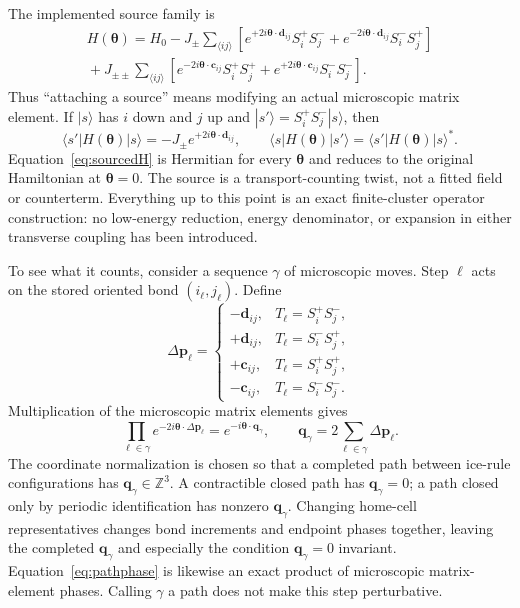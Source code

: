 \documentclass[11pt]{article}
\newcommand{\Jpm}{J_{\pm}}
\newcommand{\Jpp}{J_{\pm\pm}}
\newcommand{\bq}{\bm q}
\newcommand{\btheta}{\bm\theta}
\begin{document}
The implemented source family is
\begin{align}
 H(\btheta)=H_0-\Jpm\sum_{\langle ij\rangle}
 \left[e^{+2i\btheta\cdot\bm d_{ij}}S_i^+S_j^-
      +e^{-2i\btheta\cdot\bm d_{ij}}S_i^-S_j^+\right]\nonumber\\
 {}+\Jpp\sum_{\langle ij\rangle}
 \left[e^{-2i\btheta\cdot\bm c_{ij}}S_i^+S_j^+
      +e^{+2i\btheta\cdot\bm c_{ij}}S_i^-S_j^-\right].
 \label{eq:sourcedH}
\end{align}
Thus ``attaching a source'' means modifying an actual microscopic matrix
element.  If $|s\rangle$ has $i$ down and $j$ up and
$|s'\rangle=S_i^+S_j^-|s\rangle$, then
\begin{equation}
 \langle s'|H(\btheta)|s\rangle
 =-\Jpm e^{+2i\btheta\cdot\bm d_{ij}},
 \qquad
 \langle s|H(\btheta)|s'\rangle
 =\langle s'|H(\btheta)|s\rangle^*.
 \label{eq:matrixelement}
\end{equation}
Equation~\eqref{eq:sourcedH} is Hermitian for every $\btheta$ and reduces to
the original Hamiltonian at $\btheta=0$.  The source is a transport-counting
twist, not a fitted field or counterterm.  Everything up to this point is an
exact finite-cluster operator construction: no low-energy reduction, energy
denominator, or expansion in either transverse coupling has been introduced.

To see what it counts, consider a sequence $\gamma$ of microscopic moves.
Step $\ell$ acts on the stored oriented bond $(i_\ell,j_\ell)$.  Define
\begin{equation}
 \Delta\bm p_\ell=\begin{cases}
 -\bm d_{ij},&T_\ell=S_i^+S_j^-,\\
 +\bm d_{ij},&T_\ell=S_i^-S_j^+,\\
 +\bm c_{ij},&T_\ell=S_i^+S_j^+,\\
 -\bm c_{ij},&T_\ell=S_i^-S_j^-.
 \end{cases}
 \label{eq:polarizationincrement}
\end{equation}
Multiplication of the microscopic matrix elements gives
\begin{equation}
 \prod_{\ell\in\gamma}e^{-2i\btheta\cdot\Delta\bm p_\ell}
 =e^{-i\btheta\cdot\bq_\gamma},
 \qquad
 \bq_\gamma=2\sum_{\ell\in\gamma}\Delta\bm p_\ell.
 \label{eq:pathphase}
\end{equation}
The coordinate normalization is chosen so that a completed path between
ice-rule configurations has $\bq_\gamma\in\mathbb Z^3$.  A contractible
closed path has $\bq_\gamma=0$; a path closed only by periodic identification
has nonzero $\bq_\gamma$.  Changing home-cell representatives changes bond
increments and endpoint phases together, leaving the completed
$\bq_\gamma$ and especially the condition $\bq_\gamma=0$ invariant.
Equation~\eqref{eq:pathphase} is likewise an exact product of microscopic
matrix-element phases.  Calling $\gamma$ a path does not make this step
perturbative.
\end{document}
